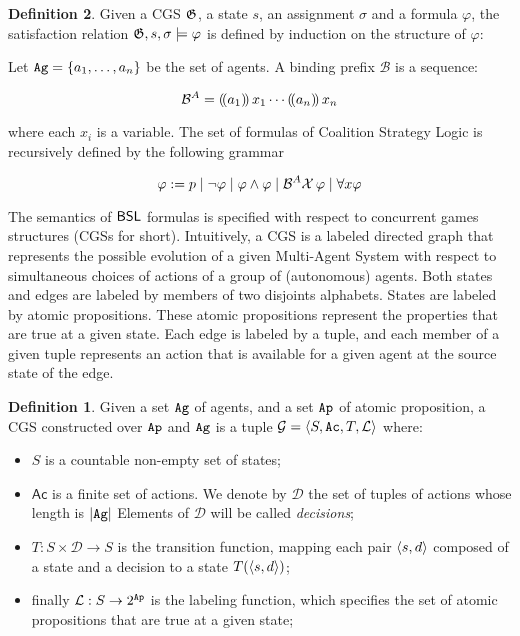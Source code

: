 \documentclass{article}
\theoremstyle{definition}
\newtheorem{definition}{Definition}[section]
\begin{document}
\begin{definition}
     Given a CGS $\mathfrak{G}$, a state $s$, an assignment $\sigma$ and a formula $\varphi$, the satisfaction relation $\mathfrak{G},s,\sigma \models \varphi$ is defined by induction on the structure of $\varphi$: 





Let $\texttt{Ag}=\{a_1,\ldots, a_n\}$ be the set of agents. A binding prefix $\mathcal{B}$ is a sequence: 

$$\mathcal{B}^A = (\!( a_1 )\!)\,{x_1}\cdots (\!( a_n )\!)\,{x_n}$$

where each $x_i$ is a variable. The set of formulas of Coalition Strategy Logic  is recursively defined by the following grammar

$$\varphi:= p \mid \neg \varphi \mid \varphi \land \varphi \mid  \mathcal{B}^A \mathcal{X}\, \varphi\mid \forall x \varphi $$


The semantics of $\mathsf{BSL}$ formulas is specified with respect to concurrent games structures (CGSs for short). Intuitively, a CGS is a labeled directed  graph that represents the possible evolution of a given Multi-Agent System with respect to simultaneous choices of actions of a group of (autonomous) agents. 
Both states and edges are labeled by members of two disjoints alphabets. States are labeled by atomic propositions. These atomic propositions represent the properties that are true at a given state. Each edge is labeled by a tuple, and each member of a given tuple represents an action that is available for a given agent at the source state of the edge. 

\begin{definition}
Given a set $\texttt{Ag}$ of agents, and a set $\texttt{Ap}$ of atomic proposition, a CGS constructed over $\texttt{Ap}$ and $\texttt{Ag}$ is a tuple 
$\mathcal{G}=\langle S, \texttt{Ac},T,\mathcal{L} \rangle$ where: 
\begin{itemize}
    \item $S$ is a countable non-empty set of states;
    \item $\mathsf{Ac}$ is a finite set of actions. We denote by $\mathcal{D}$ the set of tuples of actions whose length is $|\texttt{Ag}|$
    Elements of $\mathcal{D}$ will be called \emph{decisions}; 
    \item   $T: S \times \mathcal{D} \to S$ is the transition function, mapping each pair $\langle s,d \rangle$ composed of a state and a decision to a state $T(\langle s,d \rangle)$; 
    \item finally $\mathcal{L}: S\to 2^{\texttt{Ap}}$ is the labeling function, which specifies the set of atomic propositions that are true at a given state; 
 \end{itemize}
\end{definition}



\end{definition}
\end{document}
